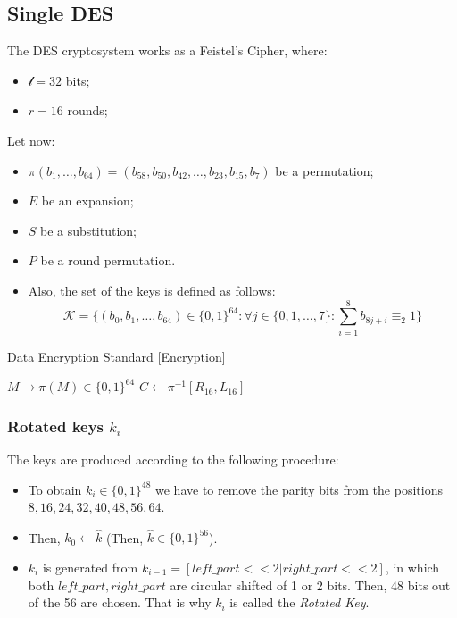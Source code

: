 \subsection{Single DES}
The DES cryptosystem works as a Feistel's Cipher, where:
\begin{itemize}
    \item $\mathcal{l} = 32$ bits;
    \item $r = 16$ rounds;
\end{itemize}
Let now:
\begin{itemize}
    \item $\pi(b_{1}, \dots, b_{64}) = (b_{58}, b_{50}, b_{42}, \dots, b_{23}, b_{15}, b_{7})$ be a permutation;
    \item $E$ be an expansion;
    \item $S$ be a substitution;
    \item $P$ be a round permutation.
    \item Also, the set of the keys is defined as follows:
    \[\mathcal{K} = \{(b_{0}, b_{1}, \dots, b_{64}) \in \{0,1\}^{64}: \forall j \in \{0, 1, \dots,7\}: \sum_{i=1}^{8} b_{8j + i} \equiv_{2} 1\}\]
\end{itemize}

\begin{algorithm}
\caption{Data Encryption Standard [Encryption]}\label{alg:DES_encrypt}
$M \rightarrow \pi(M) \in \{0,1\}^{64}$\;
$C \gets \pi^{-1}[R_{16}, L_{16}]$\;
\end{algorithm}

\subsubsection{Rotated keys $k_i$}
The keys are produced according to the following procedure:
\begin{itemize}
    \item To obtain $k_{i} \in \{0,1\}^{48}$ we have to remove the parity bits from the positions $8, 16, 24, 32, 40, 48, 56, 64$.
    \item Then, $k_{0} \gets \hat{k}$ (Then, $\hat{k} \in \{0,1\}^{56}$).
    \item $k_{i}$ is generated from $k_{i-1} = [left\_part << 2 | right\_part << 2]$, in which both $left\_part, right\_part$ are circular shifted of 1 or 2 bits. Then, 48 bits out of the 56 are chosen. That is why $k_{i}$ is called the \emph{Rotated Key}.
\end{itemize}

